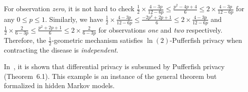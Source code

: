 For observation \textit{zero}, it is not hard to check $\frac{1}{2}
\times \frac{4-3p}{12-6p} \leq \frac{p^2 - 4p + 4}{6} \leq 2 \times
\frac{4-3p}{12-6p}$ for any $0 \leq p \leq 1$. Similarly, we have
$\frac{1}{2} \times 
\frac{4-3p}{12-6p} \leq \frac{-2p^2 + 2p + 1}{6} \leq 2 \times
\frac{4-3p}{12-6p}$ and $\frac{1}{2} \times \frac{2}{6-3p} \leq
\frac{p^2 + 2p + 1}{6} \leq 2 \times \frac{2}{6-3p}$  for observations
\textit{one} and \textit{two} respectively. Therefore, the
$\frac{1}{2}$-geometric mechanism satisfies $\ln(2)$-Pufferfish
privacy when contracting the disease is \emph{independent}. 
 
In~\cite{KM:14:PFMPD}, it is shown that differential privacy is
subsumed by Pufferfish privacy (Theorem~6.1). This example is an
instance of the general theorem but formalized in hidden Markov
models. 

